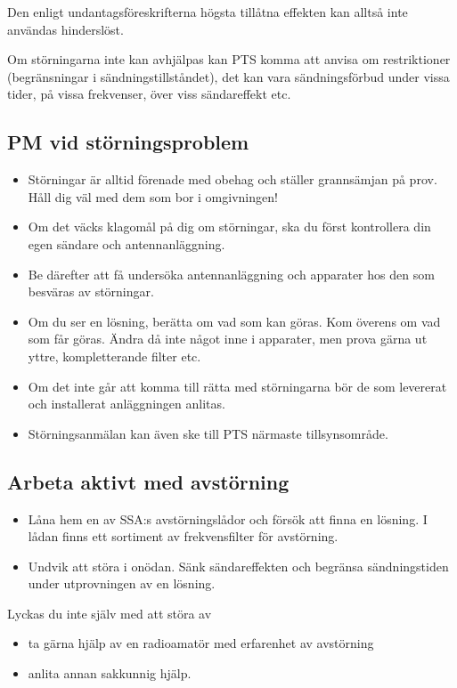 Den enligt undantagsföreskrifterna högsta tillåtna effekten kan alltså inte användas hinderslöst.

Om störningarna inte kan avhjälpas kan PTS komma att anvisa om restriktioner
(begränsningar i sändningstillståndet), det kan vara sändningsförbud under
vissa tider, på vissa frekvenser, över viss sändareffekt etc.

\subsection{PM vid störningsproblem}
\begin{itemize}
\item Störningar är alltid förenade med obehag och ställer grannsämjan
  på prov. Håll dig väl med dem som bor i omgivningen!
\item Om det väcks klagomål på dig om störningar, ska du först
  kontrollera din egen sändare och antennanläggning.
\item Be därefter att få undersöka antennanläggning och apparater hos
  den som besväras av störningar.
\item Om du ser en lösning, berätta om vad som kan göras. Kom överens
  om vad som får göras. Ändra då inte något inne i apparater, men
  prova gärna ut yttre, kompletterande filter etc.
\item Om det inte går att komma till rätta med störningarna bör de som
  levererat och installerat anläggningen anlitas.
\item Störningsanmälan kan även ske till PTS närmaste tillsynsområde.
\end{itemize}

\subsection{Arbeta aktivt med avstörning}
\begin{itemize}
\item Låna hem en av SSA:s avstörningslådor och försök att finna en
  lösning. I lådan finns ett sortiment av frekvensfilter för
  avstörning.
\item Undvik att störa i onödan. Sänk sändareffekten och begränsa
  sändningstiden under utprovningen av en lösning.
\end{itemize}

Lyckas du inte själv med att störa av
\begin{itemize}
\item ta gärna hjälp av en radioamatör med erfarenhet av avstörning
\item anlita annan sakkunnig hjälp.
\end{itemize}
